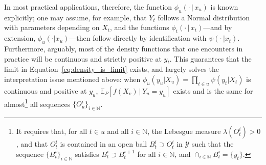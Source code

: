 \documentclass[twoside,11pt]{article}
\newcommand{\nats}{\mathbb{N}}
\newcommand{\states}{\mathcal{X}}
\newcommand{\observs}{\mathcal{Y}}
\begin{document}
In most practical applications, therefore, the function $\phi_u(\cdot\,\vert\,x_u)$ is known explicitly; one may assume, for example, that $Y_t$ follows a Normal distribution with parameters depending on $X_t$, and the functions $\phi_t(\cdot\,\vert\,x_t)$---and by extension, $\phi_u(\cdot\vert x_u)$---then follow directly by identification with $\psi(\cdot\,\vert x_t)$. Furthermore, arguably, most of the density functions that one encounters in practice will be continuous and strictly positive at $y_t$. This guarantees that the limit in Equation~\eqref{eq:density_is_limit} exists, and largely solves the interpretation issue mentioned above: when $\phi_u(y_u\vert X_u)=\prod_{t\in u}\psi(y_t\vert X_t)$ is continuous and positive at $y_u$, $\mathbb{E}_P[f(X_v)\,\vert\,Y_u=y_u]$ exists and is the same for almost\footnote{\label{fnote:limit_required_properties}It requires that, for all $t\in u$ and all $i\in\nats$, the Lebesgue measure $\lambda(O_t^i)>0$, and that $O_t^i$ is contained in an open ball $B_t^i\supset O_t^i$ in $\observs$ such that the sequence $\{B_t^i\}_{i\in\nats}$ satisfies $B_t^i\supset B_t^{i+1}$ for all $i\in\nats$, and $\cap_{i\in\nats}B_t^i=\{y_t\}$.} all sequences $\{O_u^i\}_{i\in\nats}$. 

\end{document}
